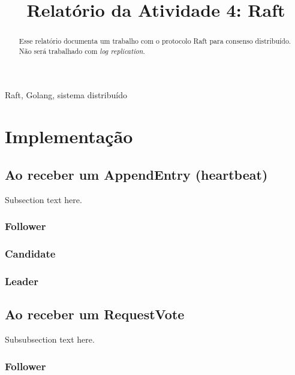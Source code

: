 \documentclass[journal,onecolumn]{IEEEtran}
\begin{document}
\title{Relatório da Atividade 4: Raft}

\author{
}

\maketitle

\begin{abstract}
Esse relatório documenta um trabalho com o protocolo Raft para consenso distribuído. Não será trabalhado com \textit{log replication}.
\end{abstract}

\begin{IEEEkeywords}
Raft, Golang, sistema distribuído
\end{IEEEkeywords}

\section{Implementação}

\subsection{Ao receber um AppendEntry (heartbeat)}
Subsection text here.

\subsubsection{Follower}
\subsubsection{Candidate}
\subsubsection{Leader}

\subsection{Ao receber um RequestVote}
Subsubsection text here.

\subsubsection{Follower}
\end{document}

